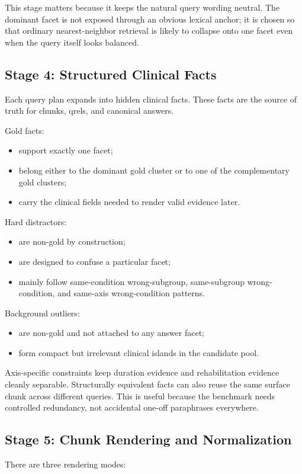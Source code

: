 \documentclass[11pt,a4paper]{article}
\newcommand{\stage}[2]{\subsection{\textcolor{betterblue}{#1}: #2}}
\begin{document}
This stage matters because it keeps the natural query wording neutral. The dominant facet is not exposed through an obvious lexical anchor; it is chosen so that ordinary nearest-neighbor retrieval is likely to collapse onto one facet even when the query itself looks balanced.

\stage{Stage 4}{Structured Clinical Facts}

Each query plan expands into hidden clinical facts. These facts are the source of truth for chunks, qrels, and canonical answers.

Gold facts:

\begin{itemize}[noitemsep, topsep=0pt]
	\item support exactly one facet;
	\item belong either to the dominant gold cluster or to one of the complementary gold clusters;
	\item carry the clinical fields needed to render valid evidence later.
\end{itemize}

Hard distractors:

\begin{itemize}[noitemsep, topsep=0pt]
	\item are non-gold by construction;
	\item are designed to confuse a particular facet;
	\item mainly follow same-condition wrong-subgroup, same-subgroup wrong-condition, and same-axis wrong-condition patterns.
\end{itemize}

Background outliers:

\begin{itemize}[noitemsep, topsep=0pt]
	\item are non-gold and not attached to any answer facet;
	\item form compact but irrelevant clinical islands in the candidate pool.
\end{itemize}

Axis-specific constraints keep duration evidence and rehabilitation evidence cleanly separable. Structurally equivalent facts can also reuse the same surface chunk across different queries. This is useful because the benchmark needs controlled redundancy, not accidental one-off paraphrases everywhere.

\stage{Stage 5}{Chunk Rendering and Normalization}

There are three rendering modes:
\end{document}
